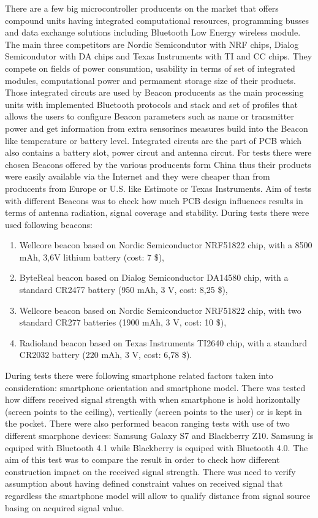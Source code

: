 \documentclass[../main.tex]{subfiles}
\begin{document}
There are a few big microcontroller producents on the market that offers compound units having integrated computational resources, programming busses and data exchange solutions including Bluetooth Low Energy wireless module. The main three competitors are Nordic Semicondutor with NRF chips, Dialog Semicondutor with DA chips and Texas Instruments with TI and CC chips. They compete on fields of power consumtion, usability in terms of set of integrated modules, computational power and permament storage size of their products. Those integrated circuts are used by Beacon producents as the main processing units with implemented Bluetooth protocols and stack and set of profiles that allows the users to configure Beacon parameters such as name or transmitter power and get information from extra sensorincs measures build into the Beacon like temperature or battery level. Integrated circuts are the part of PCB which also contains a battery slot, power circut and antenna circut. For tests there were chosen Beacons offered by the various producents form China thus their products were easily available via the Internet and they were cheaper than from producents from Europe or U.S. like Estimote or Texas Instruments\cite{beacons_ble_evaluation}. Aim of tests with different Beacons was to check how much PCB design influences results in terms of antenna radiation, signal coverage and stability. During tests there were used following beacons:
\begin{enumerate}
	\item Wellcore beacon based on Nordic Semiconductor NRF51822 chip, with a 8500 mAh, 3,6V lithium battery (cost: 7 \$),
	\item ByteReal beacon based on Dialog Semiconductor DA14580 chip, with a standard CR2477 battery (950 mAh, 3 V, cost: 8,25 \$),
	\item Wellcore beacon based on Nordic Semiconductor NRF51822 chip, with two standard CR277 batteries (1900 mAh, 3 V, cost: 10 \$),
	\item Radioland beacon based on Texas Instruments TI2640 chip, with a standard CR2032 battery (220 mAh, 3 V, cost: 6,78 \$).
\end{enumerate}

During tests there were following smartphone related factors taken into consideration: smartphone orientation and smartphone model. There was tested how differs received signal strength with when smartphone is hold horizontally (screen points to the ceiling), vertically (screen points to the user) or is kept in the pocket. There were also performed beacon ranging tests with use of two different smarphone devices: Samsung Galaxy S7 and Blackberry Z10. Samsung is equiped with Bluetooth 4.1 while Blackberry is equiped with Bluetooth 4.0. The aim of this test was to compare the result in order to check how different construction impact on the received signal strength. There was need to verify assumption about having defined constraint values on received signal that regardless the smartphone model will allow to qualify distance from signal source basing on acquired signal value.
\end{document}

